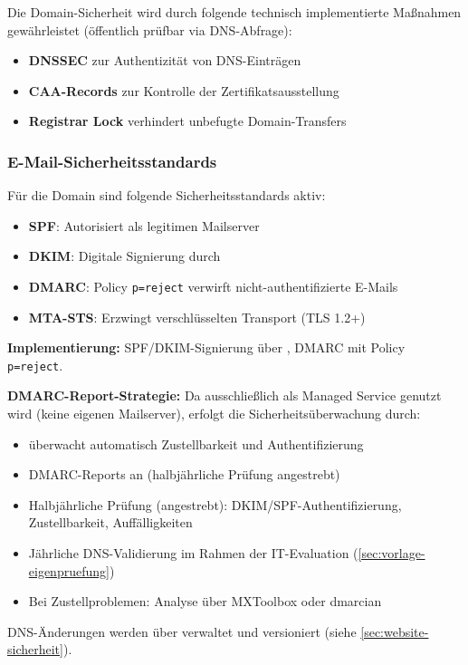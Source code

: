 Die Domain-Sicherheit wird durch folgende technisch implementierte Maßnahmen
gewährleistet (öffentlich prüfbar via DNS-Abfrage):
\begin{itemize}
  \item \textbf{DNSSEC} zur Authentizität von DNS-Einträgen
  \item \textbf{CAA-Records} zur Kontrolle der Zertifikatsausstellung
  \item \textbf{Registrar Lock} verhindert unbefugte Domain-Transfers
\end{itemize}

\subsubsection{E-Mail-Sicherheitsstandards}
Für die Domain \texttt{\PraxisDomain} sind folgende Sicherheitsstandards aktiv:
\begin{itemize}
\item \textbf{SPF}: Autorisiert \EmailAnbieter{} als legitimen Mailserver
\item \textbf{DKIM}: Digitale Signierung durch \EmailAnbieter{}
\item \textbf{DMARC}: Policy \texttt{p=reject} verwirft nicht-authentifizierte E-Mails
\item \textbf{MTA-STS}: Erzwingt verschlüsselten Transport (TLS 1.2+)
\end{itemize}

\textbf{Implementierung:} SPF/DKIM-Signierung über \EmailAnbieter{}, DMARC mit Policy \texttt{p=reject}.

\textbf{DMARC-Report-Strategie:} Da ausschließlich \EmailAnbieter{} als Managed Service
genutzt wird (keine eigenen Mailserver), erfolgt die Sicherheitsüberwachung durch:
\begin{itemize}
  \item \EmailAnbieter{} überwacht automatisch Zustellbarkeit und Authentifizierung
  \item DMARC-Reports an \texttt{\PostmasterEmail} (halbjährliche Prüfung angestrebt)
  \item Halbjährliche Prüfung (angestrebt): DKIM/SPF-Authentifizierung, Zustellbarkeit, Auffälligkeiten
  \item Jährliche DNS-Validierung im Rahmen der IT-Evaluation (\cref{sec:vorlage-eigenpruefung})
  \item Bei Zustellproblemen: Analyse über MXToolbox oder dmarcian
\end{itemize}

DNS-Änderungen werden über \IaCTool{} verwaltet und versioniert
(siehe \cref{sec:website-sicherheit}).

